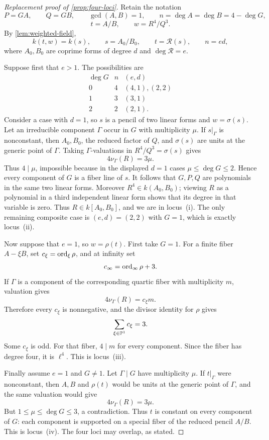 
\begin{proof}[Replacement proof of \cref{prop:four-loci}]
Retain the notation
\[
 P=GA,\qquad Q=GB,\qquad \gcd(A,B)=1,
 \qquad n=\deg A=\deg B=4-\deg G,
\]
\[
 t=A/B,\qquad w=R^4/Q^3.
\]
By \cref{lem:weighted-field},
\[
 k(t,w)=k(s),\qquad s=A_0/B_0,
 \qquad t=\mathcal R(s),\qquad n=ed,
\]
where \(A_0,B_0\) are coprime forms of degree \(d\) and
\(\deg\mathcal R=e\).

Suppose first that \(e>1\).  The possibilities are
\[
\begin{array}{c|c|c}
\deg G&n&(e,d)\\ \hline
0&4&(4,1),(2,2)\\
1&3&(3,1)\\
2&2&(2,1).
\end{array}
\]
Consider a case with \(d=1\), so \(s\) is a pencil of two linear forms and
\(w=\sigma(s)\).  Let an irreducible component \(\Gamma\) occur in \(G\)
with multiplicity \(\mu\).  If \(s|_\Gamma\) is nonconstant, then
\(A_0,B_0\), the reduced factor of \(Q\), and \(\sigma(s)\) are units at
the generic point of \(\Gamma\).  Taking \(\Gamma\)-valuations in
\(R^4/Q^3=\sigma(s)\) gives
\[
 4\nu_\Gamma(R)=3\mu.
\]
Thus \(4\mid\mu\), impossible because in the displayed \(d=1\) cases
\(\mu\le\deg G\le2\).  Hence every component of \(G\) is a fiber line of
\(s\).  It follows that \(G,P,Q\) are polynomials in the same two linear
forms.  Moreover \(R^4\in k(A_0,B_0)\); viewing \(R\) as a polynomial in a
third independent linear form shows that its degree in that variable is
zero.  Thus \(R\in k[A_0,B_0]\), and we are in locus~(i).  The only
remaining composite case is \((e,d)=(2,2)\) with \(G=1\), which is exactly
locus~(ii).

Now suppose that \(e=1\), so \(w=\rho(t)\).  First take \(G=1\).  For a
finite fiber \(A-\xi B\), set \(c_\xi=\operatorname{ord}_\xi\rho\), and at infinity set
\[
 c_\infty=\operatorname{ord}_\infty\rho+3.
\]
If \(\Gamma\) is a component of the corresponding quartic fiber with
multiplicity \(m\), valuation gives
\[
 4\nu_\Gamma(R)=c_\xi m.
\]
Therefore every \(c_\xi\) is nonnegative, and the divisor identity for
\(\rho\) gives
\[
 \sum_{\xi\in\mathbb P^1}c_\xi=3.
\]
Some \(c_\xi\) is odd.  For that fiber, \(4\mid m\) for every component.
Since the fiber has degree four, it is \(\ell^4\).  This is locus~(iii).

Finally assume \(e=1\) and \(G\ne1\).  Let \(\Gamma\mid G\) have
multiplicity \(\mu\).  If \(t|_\Gamma\) were nonconstant, then \(A,B\) and
\(\rho(t)\) would be units at the generic point of \(\Gamma\), and the same
valuation would give
\[
 4\nu_\Gamma(R)=3\mu.
\]
But \(1\le\mu\le\deg G\le3\), a contradiction.  Thus \(t\) is constant on
every component of \(G\): each component is supported on a special fiber
of the reduced pencil \(A/B\).  This is locus~(iv).  The four loci may
overlap, as stated.
\end{proof}


